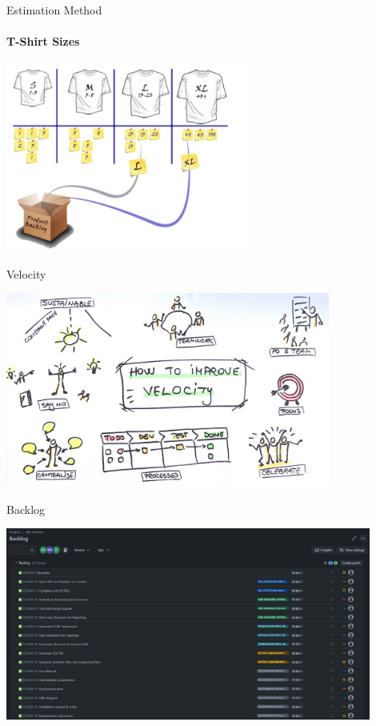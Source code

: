\documentclass[
    ngerman,%
    authorontitle=true,
]{bfhbeamer}
\begin{document}
    \begin{frame}{Estimation Method}
        \framesubtitle{T-Shirt Sizes}
        \begin{center}
            \includegraphics[width=0.6\textwidth]{pictures/tshirt_sizes}
        \end{center}
    \end{frame}

    \begin{frame}{Velocity}
        \begin{center}
            \includegraphics[width=0.8\textwidth]{pictures/velocity}
        \end{center}
    \end{frame}

    \begin{frame}{Backlog}
        \begin{center}
            \includegraphics[width=0.9\textwidth]{pictures/backlog}
        \end{center}
    \end{frame}
\end{document}

